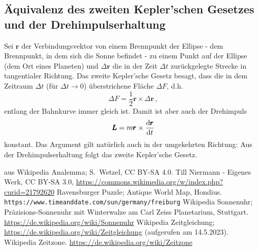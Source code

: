 \subsection{\"Aquivalenz des zweiten Kepler'schen Gesetzes und der Drehimpulserhaltung}
\label{sec_Zeitgleichung_A}

Sei $\pmb{r}$ der Verbindungsvektor von einem Brennpunkt der Ellipse - dem Brennpunkt, in 
dem sich die Sonne befindet - zu einem Punkt auf der Ellipse (dem Ort eines Planeten)
und $\Delta \pmb{r}$ die in der Zeit $\Delta t$ zur\"uckgelegte Strecke in tangentialer
Richtung. Das zweite Kepler'sche Gesetz 
besagt, dass die in dem Zeitraum $\Delta t$ (f\"ur $\Delta t\rightarrow 0$)
\"uberstrichene Fl\"ache $\Delta F$, d.h.
\begin{equation}
                    \Delta F = \frac{1}{2} \pmb{r} \times \Delta \pmb{r} \, ,
\end{equation} 
entlang der Bahnkurve immer gleich ist. Damit ist aber auch der Drehimpuls
\begin{equation}
                    \pmb{L} = m  \pmb{r} \times \frac{{\rm d} \pmb{r}}{{\rm d} t} 
\end{equation} 
konstant.
Das Argument gilt nat\"urlich auch in der umgekehrten Richtung: Aus der
Drehimpulserhaltung folgt das zweite Kepler'sche Gesetz.


\begin{thebibliography}{99}
 aus Wikipedia \glqq Analemma\grqq; S.\ Wetzel, CC BY-SA 4.0.
 Till Niermann - Eigenes Werk, CC BY-SA 3.0, 
                \url{https://commons.wikimedia.org/w/index.php?curid=21792620}
 Ravensburger Puzzle; Antique World Map, Hondius.                 
   {\small \verb+https://www.timeanddate.com/sun/germany/freiburg+} 
 Wikipedia \glqq Sonnenuhr\grqq; 
           Pr\"azisions-Sonnenuhr mit Winterwalze am Carl Zeiss Planetarium, Stuttgart.
           \url{https://de.wikipedia.org/wiki/Sonnenuhr}   
 Wikipedia \glqq Zeitgleichung\grqq; 
                 \url{https://de.wikipedia.org/wiki/Zeitgleichung} (aufgerufen am 14.5.2023).
 Wikipedia \glqq Zeitzone\grqq. \url{https://de.wikipedia.org/wiki/Zeitzone}
\end{thebibliography}


%

